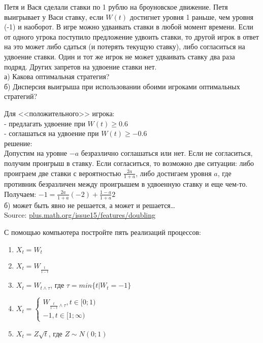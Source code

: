 \begin{problem}
Петя и Вася сделали ставки по 1 рублю на броуновское движение. Петя выигрывает у Васи ставку, если $W(t)$ достигнет уровня 1 раньше, чем уровня (-1) и наоборот. В игре можно удваивать ставки в любой момент времени. Если от одного угрока поступило предложение удвоить ставки, то другой игрок в ответ на это может либо сдаться (и потерять текущую ставку), либо согласиться на удвоение ставки. Один и тот же игрок не может удваивать ставку два раза подряд. Других запретов на удвоение ставки нет. \\
а) Какова оптимальная стратегия?\\
б) Дисперсия выигрыша при использовании обоими игроками оптимальных стратегий? \\

\end{problem} 
\begin{solution} 
Для <<положительного>> игрока: \\
- предлагать удвоение при $W(t)\geq 0.6$ \\
- соглашаться на удвоение при $W(t)\geq -0.6$ \\
решение: \\
Допустим на уровне $-a$ безразлично соглашаться или нет. Если не согласиться, получим проигрыш в ставку. Если согласиться, то возможно две ситуации: либо проиграем две ставки с вероятностью $\frac{2a}{1+a}$, либо достигаем уровня $a$, где противник безразличен между проигрышем в удвоенную ставку и еще чем-то. \\
Получаем: $-1=\frac{2a}{1+a}(-2)+\frac{1-a}{1+a}2$ \\
б) может быть явно не решается, а может и решается\ldots\\
Source: \url{plus.math.org/issue15/features/doubling}
\end{solution}

\begin{problem}
С помощью компьютера постройте пять реализаций процессов: 
\begin{enumerate}
\item $X_{t}=W_{t}$ 
\item $X_{t}=W_{\frac{t}{1-t}}$ 
\item $X_{t}=W_{t\wedge \tau}$, где $\tau=min\{t|W_{t}=-1\}$ 
\item $X_{t}=
\begin{cases}
W_{\frac{t}{1-t}\wedge\tau}, t\in [0;1) \\
-1, t\in[1;\infty) 
\end{cases}$ 
\item $X_{t}=Z\sqrt{t}$, где $Z\sim N(0;1)$ 
\end{enumerate}
\end{problem} 
\begin{solution} 

\end{solution}


